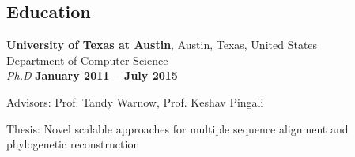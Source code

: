 \documentclass[margin,line,letterpaper]{resume}
\begin{document}
\begin{resume}
    \section{\mysidestyle Education}

    \textbf{University of Texas at Austin}, Austin, Texas, United States\\
    Department of Computer Science\vspace{2mm}\\\vspace{1mm}%
    \textsl{Ph.D} \hfill \textbf{ January 2011 -- July 2015}\vspace{-3mm}\\\vspace{-1mm}%
    \begin{list2}
        \item Advisors:  Prof. Tandy Warnow, Prof. Keshav Pingali
        \item Thesis: Novel scalable approaches for multiple sequence
alignment and phylogenetic reconstruction
    \end{list2}\vspace{-1.5mm}
    

\end{resume}
\end{document}
